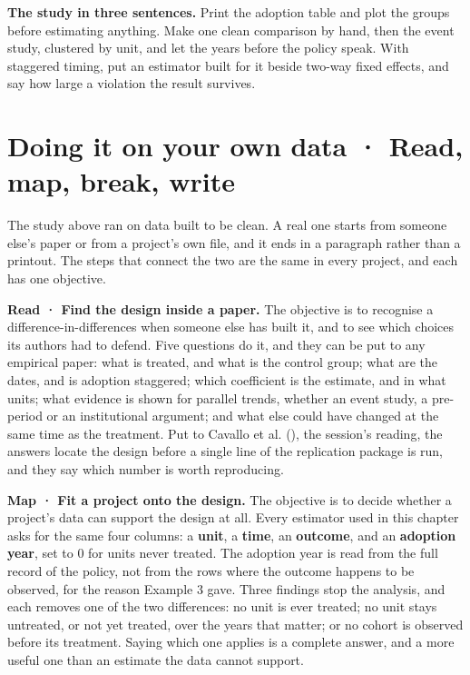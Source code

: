 \documentclass[
  letterpaper,
  10pt,
  twoside,
  openright,
  numbers=noenddot,
  chapterprefix=true]{scrbook}
\begin{document}
\textbf{The study in three sentences.} Print the adoption table and plot
the groups before estimating anything. Make one clean comparison by
hand, then the event study, clustered by unit, and let the years before
the policy speak. With staggered timing, put an estimator built for it
beside two-way fixed effects, and say how large a violation the result
survives.

\section{Doing it on your own data · Read, map, break,
write}\label{doing-it-on-your-own-data-read-map-break-write}

The study above ran on data built to be clean. A real one starts from
someone else's paper or from a project's own file, and it ends in a
paragraph rather than a printout. The steps that connect the two are the
same in every project, and each has one objective.

\textbf{Read · Find the design inside a paper.} The objective is to
recognise a difference-in-differences when someone else has built it,
and to see which choices its authors had to defend. Five questions do
it, and they can be put to any empirical paper: what is treated, and
what is the control group; what are the dates, and is adoption
staggered; which coefficient is the estimate, and in what units; what
evidence is shown for parallel trends, whether an event study, a
pre-period or an institutional argument; and what else could have
changed at the same time as the treatment. Put to Cavallo et al.
(), the session's reading, the answers
locate the design before a single line of the replication package is
run, and they say which number is worth reproducing.

\textbf{Map · Fit a project onto the design.} The objective is to decide
whether a project's data can support the design at all. Every estimator
used in this chapter asks for the same four columns: a \textbf{unit}, a
\textbf{time}, an \textbf{outcome}, and an \textbf{adoption year}, set
to 0 for units never treated. The adoption year is read from the full
record of the policy, not from the rows where the outcome happens to be
observed, for the reason Example 3 gave. Three findings stop the
analysis, and each removes one of the two differences: no unit is ever
treated; no unit stays untreated, or not yet treated, over the years
that matter; or no cohort is observed before its treatment. Saying which
one applies is a complete answer, and a more useful one than an estimate
the data cannot support.
\end{document}
